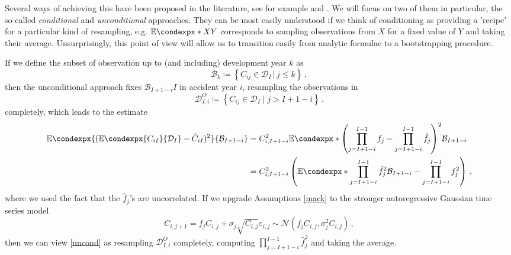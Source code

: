 \documentclass[a4paper]{book}
\theoremstyle{plain}
\newcommand{\condexp}{\mathbb{E}\condexpx}
\begin{document}
Several ways of achieving this have been proposed in the literature, see for example \cite[45]{wuthrich:stoch} and \cite[Section D6, p. 32]{mack:var}. We will focus on two of them in particular, the so-called \emph{conditional} and \emph{unconditional} approaches. They can be most easily understood if we think of conditioning as providing a 'recipe' for a particular kind of resampling, e.g. $\condexp*{X}{Y}$ corresponds to sampling observations from $X$ for a fixed value of $Y$ and taking their average. Unsurprisingly, this point of view will allow us to transition easily from analytic formulae to a bootstrapping procedure.

If we define the subset of observation up to (and including) development year $k$ as
\begin{equation}
    \mathcal{B}_k \coloneqq \left\lbrace C_{ij} \in \mathcal{D}_I \, \rvert \, j \leq k \right\rbrace \,,
\end{equation}
then the unconditional approach fixes $\mathcal{B}_{I+1-i}I$ in accident year $i$, resampling the observations in
\begin{equation}
    \mathcal{D}^O_{I, i} \coloneqq \left \lbrace C_{ij} \in \mathcal{D}_I \mid j > I + 1 - i \right\rbrace \,.
\end{equation}
completely, which leads to the estimate
\begin{align} \label{uncond}
    \condexp{(\condexp{C_{iI}}{\mathcal{D}_I} - \hat{C}_{iI})^2}{\mathcal{B}_{I+1-i}} &= C^2_{i, I+1-i} \condexp*{\left( \prod_{j=I+1-i}^{I-1}f_j - \prod_{j=I+1-i}^{I-1}\hat{f}_j \right)^2}{\mathcal{B}_{I+1-i}} \\
    &= C^2_{i, I+1-i} \left( \condexp*{\prod_{j=I+1-i}^{I-1}\hat{f}^2_j}{\mathcal{B}_{I+1-i}} - \prod_{j=I+1-i}^{I-1}f^2_j \right)\,,
\end{align}
where we used the fact that the $\hat{f}_j$'s are uncorrelated. If we upgrade Assumptions \ref{mack} to the stronger autoregressive Gaussian time series model
\begin{equation} \label{tsmodel}
    C_{i, j+1} = f_j C_{i,j} + \sigma_j \sqrt{C_{i,j}} \varepsilon_{i, j} \sim \mathcal{N}(f_j C_{i, j}, \sigma_j^2 C_{i, j}) \,,
\end{equation}
then we can view \ref{uncond} as resampling $\mathcal{D}^O_{I, i}$ completely, computing $\prod_{j=I+1-i}^{I-1}\hat{f}^2_j$ and taking the average. 
\end{document}
